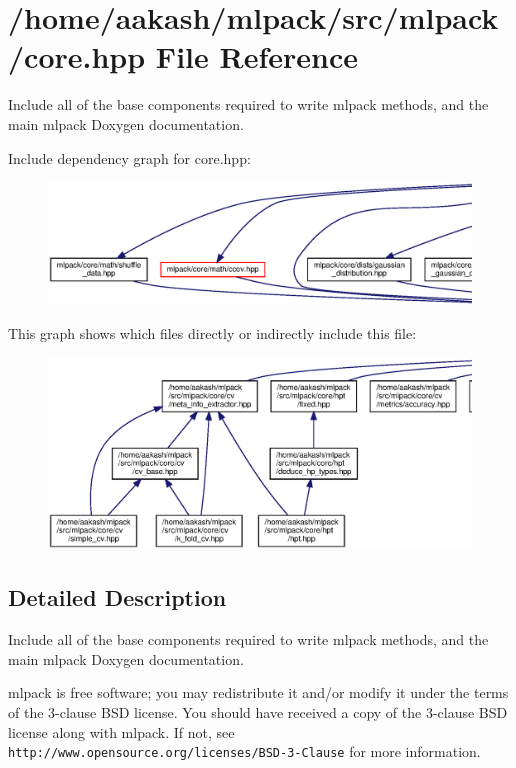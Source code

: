 \section{/home/aakash/mlpack/src/mlpack/core.hpp File Reference}
\label{core_8hpp}


Include all of the base components required to write mlpack methods, and the main mlpack Doxygen documentation.  


Include dependency graph for core.\+hpp\+:
\nopagebreak
\begin{figure}[H]
\begin{center}
\leavevmode
\includegraphics[width=350pt]{core_8hpp__incl}
\end{center}
\end{figure}
This graph shows which files directly or indirectly include this file\+:
\nopagebreak
\begin{figure}[H]
\begin{center}
\leavevmode
\includegraphics[width=350pt]{core_8hpp__dep__incl}
\end{center}
\end{figure}


\subsection{Detailed Description}
Include all of the base components required to write mlpack methods, and the main mlpack Doxygen documentation. 

mlpack is free software; you may redistribute it and/or modify it under the terms of the 3-\/clause B\+SD license. You should have received a copy of the 3-\/clause B\+SD license along with mlpack. If not, see {\tt http\+://www.\+opensource.\+org/licenses/\+B\+S\+D-\/3-\/\+Clause} for more information. 